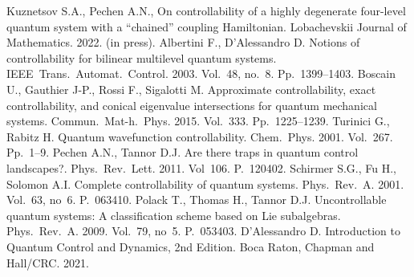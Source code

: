 \documentclass[12pt]{llncs}
\begin{document}
\begin{thebibliography}{9} %
Kuznetsov S.A., Pechen A.N., On controllability of a highly degenerate four-level quantum system with a ``chained'' coupling Hamiltonian. Lobachevskii Journal of Mathematics. 2022. (in press).
Albertini F., D'Alessandro D. Notions of controllability for bilinear multilevel quantum systems. IEEE~Trans.~Automat.~Control. 2003. Vol.~48, no.~8. Pp.~1399--1403.
Boscain U., Gauthier J-P., Rossi F., Sigalotti M. Approximate controllability, exact controllability, and conical eigenvalue intersections for quantum mechanical systems. Commun.~Mat-h.~Phys. 2015. Vol.~333. Pp.~1225--1239.
Turinici G., Rabitz H. Quantum wavefunction controllability. Chem.~Phys. 2001. Vol.~267. Pp.~1--9.
Pechen A.N., Tannor D.J. Are there traps in quantum control landscapes?. Phys.~Rev.~Lett. 2011. Vol~106. P.~120402.
Schirmer S.G., Fu H., Solomon A.I. Complete controllability of quantum systems. Phys.~Rev.~A. 2001. Vol.~63, no~6. P.~063410.
Polack T., Thomas H., Tannor D.J. Uncontrollable quantum systems: A classification scheme based on Lie subalgebras. Phys.~Rev.~A. 2009. Vol.~79, no~5. P.~053403.
D'Alessandro D. Introduction to Quantum Control and Dynamics, 2nd Edition. Boca Raton, Chapman and Hall/CRC. 2021.

\end{thebibliography}

\end{document}

